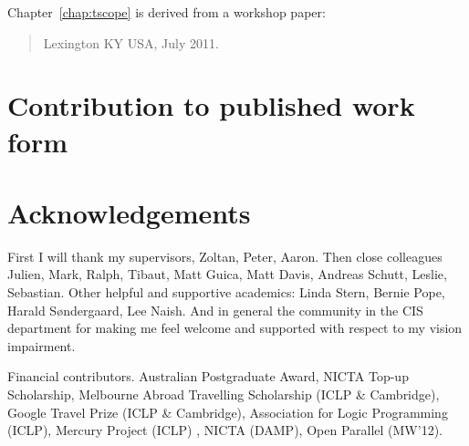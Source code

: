\documentclass[a4paper,twoside]{report}
\begin{document}
\begin{quote}
\end{quote}


Chapter~\ref{chap:tscope} is derived from a workshop paper:

\begin{quote}
{Lexington KY USA, July 2011.}
\end{quote}


\chapter*{Contribution to published work form}


\chapter*{Acknowledgements}


First I will thank my supervisors,
Zoltan,
Peter,
Aaron.
Then close colleagues
Julien, 
Mark, 
Ralph, 
Tibaut,
Matt Guica,
Matt Davis,
Andreas Schutt,
Leslie,
Sebastian.
Other helpful and supportive academics:
Linda Stern,
Bernie Pope,
Harald S{\o}ndergaard,
Lee Naish.
And in general the community in the CIS department for making me feel
welcome and supported with respect to my vision impairment.

Financial contributors.
Australian Postgraduate Award,
NICTA Top-up Scholarship,
Melbourne Abroad Travelling Scholarship (ICLP \& Cambridge),
Google Travel Prize (ICLP \& Cambridge),
Association for Logic Programming (ICLP),
Mercury Project (ICLP) ,
NICTA (DAMP),
Open Parallel (MW'12).
\end{document}
